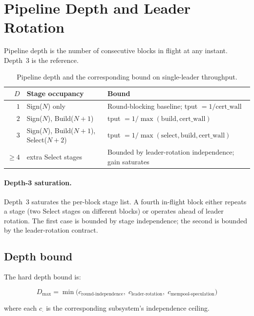 \section{Pipeline Depth and Leader Rotation}

Pipeline depth is the number of consecutive blocks in flight at any
instant. Depth~$3$ is the reference.

\begin{table}[h]
\centering
\small
\begin{tabular}{@{}rp{5cm}p{6cm}@{}}
\toprule
\textbf{$D$} & \textbf{Stage occupancy} & \textbf{Bound} \\
\midrule
$1$ & Sign($N$) only & Round-blocking baseline; tput $= 1 / \mathrm{cert\_wall}$ \\
$2$ & Sign($N$), Build($N{+}1$) & tput $= 1 / \max(\mathrm{build}, \mathrm{cert\_wall})$ \\
$3$ & Sign($N$), Build($N{+}1$), Select($N{+}2$) & tput $= 1 / \max(\mathrm{select}, \mathrm{build}, \mathrm{cert\_wall})$ \\
$\geq 4$ & extra Select stages & Bounded by leader-rotation independence; gain saturates \\
\bottomrule
\end{tabular}
\caption{Pipeline depth and the corresponding bound on
single-leader throughput.}
\label{tab:depth}
\end{table}

\paragraph{Depth-3 saturation.} Depth~$3$ saturates the per-block
stage list. A fourth in-flight block either repeats a stage (two
Select stages on different blocks) or operates ahead of leader
rotation. The first case is bounded by stage independence; the
second is bounded by the leader-rotation contract.

\subsection{Depth bound}

The hard depth bound is:

\begin{equation}
D_{\max} = \min\bigl(
  c_{\textrm{round-independence}}, \;
  c_{\textrm{leader-rotation}}, \;
  c_{\textrm{mempool-speculation}}
\bigr)
\end{equation}

\noindent where each $c_{\cdot}$ is the corresponding subsystem's
independence ceiling.

